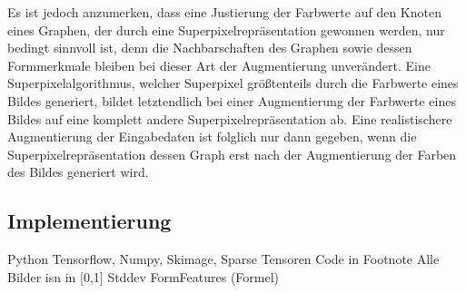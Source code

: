 Es ist jedoch anzumerken, dass eine Justierung der Farbwerte auf den Knoten eines Graphen, der durch eine Superpixelrepräsentation gewonnen werden, nur bedingt sinnvoll ist, denn die Nachbarschaften des Graphen sowie dessen Formmerkmale bleiben bei dieser Art der Augmentierung unverändert.
Eine Superpixelalgorithmus, welcher Superpixel größtenteils durch die Farbwerte eines Bildes generiert, bildet letztendlich bei einer Augmentierung der Farbwerte eines Bildes auf eine komplett andere Superpixelrepräsentation ab.
Eine realistischere Augmentierung der Eingabedaten ist folglich nur dann gegeben, wenn die Superpixelrepräsentation \bzw{} dessen Graph erst nach der Augmentierung der Farben des Bildes generiert wird.

\subsection{Implementierung}
\label{implementierung}

Python
Tensorflow, Numpy, Skimage,
Sparse Tensoren
Code in Footnote
Alle Bilder isn in [0,1]
Stddev FormFeatures (Formel)
